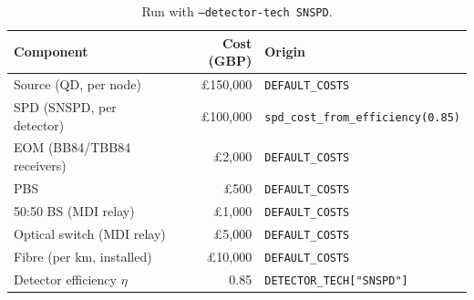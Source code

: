 \documentclass[12pt,a4paper]{article}
\begin{document}
\begin{table}[h!]
\centering
\begin{tabular}{lrl}
\toprule
Component & Cost (GBP) & Origin \\
\midrule
Source (QD, per node)          & \pounds150{,}000 & \texttt{DEFAULT\_COSTS} \\
SPD (SNSPD, per detector)      & \pounds100{,}000 & \texttt{spd\_cost\_from\_efficiency(0.85)} \\
EOM (BB84/TBB84 receivers)     & \pounds2{,}000   & \texttt{DEFAULT\_COSTS} \\
PBS                            & \pounds500       & \texttt{DEFAULT\_COSTS} \\
50:50 BS (MDI relay)           & \pounds1{,}000   & \texttt{DEFAULT\_COSTS} \\
Optical switch (MDI relay)     & \pounds5{,}000   & \texttt{DEFAULT\_COSTS} \\
Fibre (per km, installed)      & \pounds10{,}000  & \texttt{DEFAULT\_COSTS} \\
Detector efficiency $\eta$     & 0.85             & \texttt{DETECTOR\_TECH["SNSPD"]} \\
\bottomrule
\end{tabular}
\caption{Run with \texttt{--detector-tech SNSPD}.}
\end{table}
\end{document}
